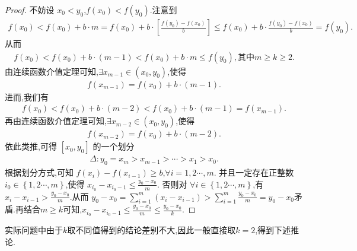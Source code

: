 \documentclass[lang=cn,newtx,10pt,scheme=chinese]{elegantbook}
\begin{document}
\begin{proof}
    不妨设 \(x_0<y_0\),\(f\left( x_0 \right) <f\left( y_0 \right)\).注意到 
    \begin{align*}
        f\left( x_0 \right) <f\left( x_0 \right) + b\cdot m = f\left( x_0 \right) + b\cdot \left[ \frac{f\left( y_0 \right) -f\left( x_0 \right)}{b} \right] \leq f\left( x_0 \right) + b\cdot \frac{f\left( y_0 \right) -f\left( x_0 \right)}{b}=f\left( y_0 \right).
    \end{align*}
从而 
\begin{align*}
    f\left( x_0 \right) <f\left( x_0 \right) + b\cdot \left( m - 1 \right) <f\left( x_0 \right) + b\cdot m\leq f\left( y_0 \right),\text{其中}m\geq k\geq 2.
\end{align*}
由连续函数介值定理可知,\(\exists x_{m - 1}\in \left( x_0,y_0 \right)\),使得 
\begin{align*}
    f\left( x_{m - 1} \right) = f\left( x_0 \right) + b\cdot \left( m - 1 \right).
\end{align*}
进而,我们有 
\begin{align*}
    f\left( x_0 \right) <f\left( x_0 \right) + b\cdot \left( m - 2 \right) <f\left( x_0 \right) + b\cdot \left( m - 1 \right) = f\left( x_{m - 1} \right).
\end{align*}
再由连续函数介值定理可知,\(\exists x_{m - 2}\in \left( x_0,y_0 \right)\),使得
\begin{align*}
   f\left( x_{m - 2} \right) = f\left( x_0 \right) + b\cdot \left( m - 2 \right).
\end{align*}
依此类推,可得 \(\left[ x_0,y_0 \right]\) 的一个划分 
\begin{align*}
    \Delta :y_0=x_m>x_{m - 1}>\cdots >x_1>x_0.
\end{align*}
根据划分方式,可知 \(f\left( x_i \right) - f\left( x_{i - 1} \right) \geq b\),\(\forall i = 1,2\cdots,m\).
并且一定存在正整数 \(i_0\in \left\{ 1,2\cdots,m \right\}\),使得 \(x_{i_0}-x_{i_0 - 1}\leq \frac{y_0 - x_0}{m}\).
否则对 \(\forall i\in \left\{ 1,2\cdots,m \right\}\),有 \(x_i - x_{i - 1}>\frac{y_0 - x_0}{m}\).从而 \(y_0 - x_0=\sum_{i = 1}^m{\left( x_i - x_{i - 1} \right)}>\sum_{i = 1}^m{\frac{y_0 - x_0}{m}} = y_0 - x_0\)矛盾.再结合$m\ge k$可知,\(x_{i_0}-x_{i_0 - 1}\leq \frac{y_0 - x_0}{m}\leq \frac{y_0 - x_0}{k}\).
\end{proof}
\begin{remark}
    实际问题中由于$k$取不同值得到的结论差别不大,因此一般直接取$k=2$,得到下述推论. 
\end{remark}
\end{document}
